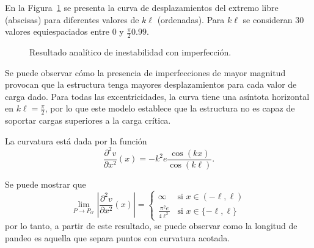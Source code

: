 En la Figura~\ref{fig:ejpand} se presenta la curva de desplazamientos del extremo libre (abscisas) para diferentes valores de $k\ell$ (ordenadas). %
%
Para $k\ell$ se consideran 30 valores equiespaciados entre $0$ y $\frac{\pi}{2} 0.99$.

\begin{figure}[htb]
	\centering
		\resizebox{.7\textwidth}{!}{}
	\caption{Resultado analítico de inestabilidad con imperfección.}
	\label{fig:ejpand}
\end{figure}

Se puede observar cómo la presencia de imperfecciones de mayor magnitud provocan que la estructura tenga mayores desplazamientos para cada valor de carga dado. %
%
Para todas las excentricidades, la curva tiene una asíntota horizontal en $k\ell=\frac{\pi}{2}$, por lo que este modelo establece que la estructura no es capaz de soportar cargas superiores a la carga crítica.


La curvatura está dada por la función 
\begin{equation}
\frac{\partial^2 v}{\partial x^2}(x) = -k^2 e \frac{\cos(k x)}{\cos(k\ell)}.
\end{equation}


Se puede mostrar que
\begin{equation}
\lim\limits_{P\rightarrow P_{cr}}
\left| \frac{\partial^2 v}{\partial x^2}(x) \right|
 =
\left\{
\begin{array}{lr}
\infty & \text{si } x \in (-\ell,\ell)\\
\displaystyle \frac{\pi^2 e}{4 \ell^2} & \text{si } x \in \{-\ell,\ell\}
\end{array}
\right.
\end{equation}
%
por lo tanto, a partir de este resultado, se puede observar como la longitud de pandeo es aquella que separa puntos con curvatura acotada.







